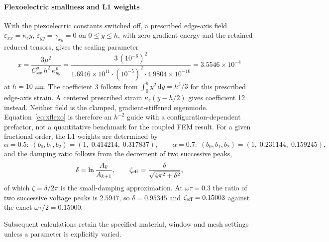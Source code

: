 \paragraph{Flexoelectric smallness and L1 weights} With the piezoelectric
constants switched off, a prescribed edge-axis field
$\varepsilon_{xx}=\kappa_c y$, $\varepsilon_{yy}=\gamma_{xy}=0$ on $0\le y\le h$,
with zero gradient energy and the retained reduced tensors, gives the scaling parameter
\begin{equation}
  x=\frac{3\mu^{2}}{C^{p}_{xx}\,h^{2}\,\kappa^{p}_{yy}}
   =\frac{3\,(10^{-6})^{2}}{1.6946\times10^{11}\cdot(10^{-5})^{2}\cdot
     4.9804\times10^{-10}}
   =3.5546\times10^{-4}
  \label{eq:xflexo}
\end{equation}
at $h=\SI{10}{\micro\meter}$. The coefficient 3 follows from
$\int_0^h y^2\,\mathrm{d}y=h^3/3$ for this prescribed edge-axis strain.
A centered prescribed strain $\kappa_c(y-h/2)$ gives coefficient 12 instead.
Neither field is the clamped, gradient-stiffened eigenmode. Equation~\eqref{eq:xflexo}
is therefore an $h^{-2}$ guide with a configuration-dependent prefactor,
not a quantitative benchmark for the coupled FEM result.
For a given fractional order, the L1 weights are determined by
\begin{equation}
  \alpha=0.5:\; (b_0,b_1,b_2)=(1,\;0.414214,\;0.317837),\qquad
  \alpha=0.7:\; (b_0,b_1,b_2)=(1,\;0.231144,\;0.159245),
  \label{eq:bweights}
\end{equation}
and the damping ratio follows from the decrement of two successive peaks,
\begin{equation}
  \delta=\ln\frac{A_k}{A_{k+1}},\qquad
  \zeta_{\rm eff}=\frac{\delta}{\sqrt{4\pi^{2}+\delta^{2}}} ,
  \label{eq:zeta}
\end{equation}
of which $\zeta=\delta/2\pi$ is the small-damping approximation. At
$\omega\tau=0.3$ the ratio of two successive voltage peaks is $2.5947$, so
$\delta=0.95345$ and $\zeta_{\rm eff}=0.15003$ against the exact
$\omega\tau/2=0.15000$.



Subsequent calculations retain the specified material, window and mesh settings unless a parameter is explicitly varied.

\FloatBarrier
